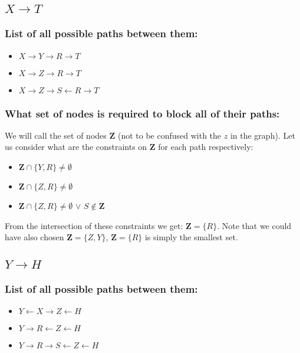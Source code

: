 \documentclass{article}
\begin{document}
\subsection{$X\rightarrow{}T$}
\subsubsection{List of all possible paths between them:}
\begin{itemize}
    \item $X\rightarrow{}Y\rightarrow{}R\rightarrow{}T$
    \item $X\rightarrow{}Z\rightarrow{}R\rightarrow{}T$
    \item $X\rightarrow{}Z\rightarrow{}S\leftarrow{}R\rightarrow{}T$
\end{itemize}
\subsubsection{What set of nodes is required to block all of their paths:}
We will call the set of nodes $\mathbf{Z}$ (not to be confused with the $z$ in the graph). Let us consider what are the constraints on $\mathbf{Z}$ for each path respectively:
\begin{itemize}
    \item $\mathbf{Z} \cap \{Y,R\} \neq \emptyset$
    \item $\mathbf{Z} \cap \{Z,R\} \neq \emptyset$
    \item $\mathbf{Z} \cap \{Z,R\} \neq \emptyset$ $\lor$ $S \notin \mathbf{Z}$
\end{itemize}
From the intersection of these constraints we get: $\mathbf{Z} = \{R\}$. Note that we could have also chosen $\mathbf{Z} = \{Z,Y\}$, $\mathbf{Z} = \{R\}$ is simply the smallest set.

\subsection{$Y\rightarrow{}H$}
\subsubsection{List of all possible paths between them:}
\begin{itemize}
    \item $Y\leftarrow{}X\rightarrow{}Z\leftarrow{}H$
    \item $Y\rightarrow{}R\leftarrow{}Z\leftarrow{}H$
    \item $Y\rightarrow{}R\rightarrow {}S\leftarrow{}Z\leftarrow{}H$
\end{itemize}
\end{document}
